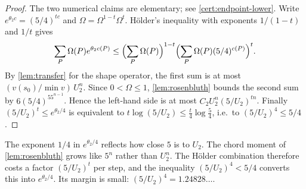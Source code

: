 \begin{proof}
The two numerical claims are elementary; see \cref{cert:endpoint-lower}. Write $e^{\theta_2c}=(5/4)^{tc}$ and $\Omega=\Omega^{1-t}\Omega^t$. H\"older's inequality with exponents $1/(1-t)$ and $1/t$ gives
\[
 \sum_P\Omega(P)e^{\theta_2c(P)}\le\Bigl(\sum_P\Omega(P)\Bigr)^{1-t}\Bigl(\sum_P\Omega(P)(5/4)^{c(P)}\Bigr)^t .
\]
By \cref{lem:transfer} for the shape operator, the first sum is at most $(v(s_0)/\min v)\,U_2^n$. Since $0<\Omega\le1$, \cref{lem:rosenbluth} bounds the second sum by $6(5/4)^55^{n-1}$. Hence the left-hand side is at most $C_2U_2^n(5/U_2)^{tn}$. Finally $(5/U_2)^t\le e^{\theta_2/4}$ is equivalent to $t\log(5/U_2)\le\frac t4\log\frac54$, i.e.\ to $(5/U_2)^4\le5/4$.
\end{proof}

\begin{remark}
The exponent $1/4$ in $e^{\theta_2/4}$ reflects how close $5$ is to $U_2$. The chord moment of \cref{lem:rosenbluth} grows like $5^n$ rather than $U_2^n$. The H\"older combination therefore costs a factor $(5/U_2)^t$ per step, and the inequality $(5/U_2)^4<5/4$ converts this into $e^{\theta_2/4}$. Its margin is small: $(5/U_2)^4=1.24828\ldots$.
\end{remark}

